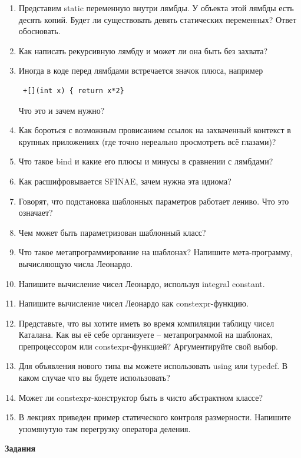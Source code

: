 \documentclass[a4paper,12pt,oneside]{book}
\begin{document}
\begin{enumerate}
\item Представим static переменную внутри лямбды. У объекта этой лямбды есть десять копий. Будет ли существовать девять статических переменных? Ответ обосновать.
\item Как написать рекурсивную лямбду и может ли она быть без захвата?
\item Иногда в коде перед лямбдами встречается значок плюса, например
\begin{lstlisting}
 +[](int x) { return x*2}
\end{lstlisting} 
Что это и зачем нужно?
\item Как бороться с возможным провисанием ссылок на захваченный контекст в крупных приложениях (где точно нереально просмотреть всё глазами)?
\item Что такое bind и какие его плюсы и минусы в сравнении с лямбдами?
%
%
\item Как расшифровывается SFINAE, зачем нужна эта идиома?
\item Говорят, что подстановка шаблонных параметров работает лениво. Что это означает?
\item Чем может быть параметризован шаблонный класс?
\item Что такое метапрограммирование на шаблонах? Напишите мета-программу, вычисляющую числа Леонардо.
\item Напишите вычисление чисел Леонардо, используя integral constant.
\item Напишите вычисление чисел Леонардо как constexpr-функцию.
\item Представьте, что вы хотите иметь во время компиляции таблицу чисел Каталана. Как вы её себе организуете -- метапрограммой на шаблонах, препроцессором или constexpr-функцией? Аргументируйте свой выбор.
\item Для объявления нового типа вы можете использовать using или typedef. В каком случае что вы будете использовать?
\item Может ли constexpr-конструктор быть в чисто абстрактном классе?
\item В лекциях приведен пример статического контроля размерности. Напишите упомянутую там перегрузку оператора деления.
\end{enumerate}

\textbf{Задания}
\end{document}
